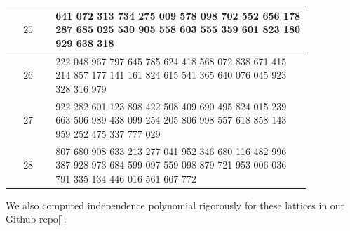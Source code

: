 \documentclass[onefignum, onetabnum]{siamart190516}
\newcommand{\<}{\langle}
\renewcommand{\>}{\rangle}
\newcommand{\blue}[1]{[{\bf  \color{blue}{JG: #1}}]}
\begin{document}
\begin{table}[h]
\begin{center}
\begin{tabular}{|c| >{\centering\arraybackslash} p{0.85\linewidth}|}
 \hline $ 25$ & 83 641 072 313 734 275 009 578 098 702 552 656 178 287 685 025 530 905 558 603 555 359 601 823 180 929 638 318  \\
 \hline $ 26$ & 368 222 048 967 797 645 785 624 418 568 072 838 671 415 214 857 177 141 161 824 615 541 365 640 076 045 923 328 316 979  \\
 \hline $ 27$ & 2 922 282 601 123 898 422 508 409 690 495 824 015 239 663 506 989 438 099 254 205 806 998 557 618 858 143 959 252 475 337 777 029  \\
 \hline $ 28$ & 41 807 680 908 633 213 277 041 952 346 680 116 482 996 387 928 973 684 599 097 559 098 879 721 953 006 036 791 335 134 446 016 561 667 772 \\
  \hline
\end{tabular}
\end{center}
\label{tbl:kingsgrid}
\end{table}

We also computed independence polynomial rigorously for these lattices in our Github repo\blue{add link to the repo}.
\end{document}
